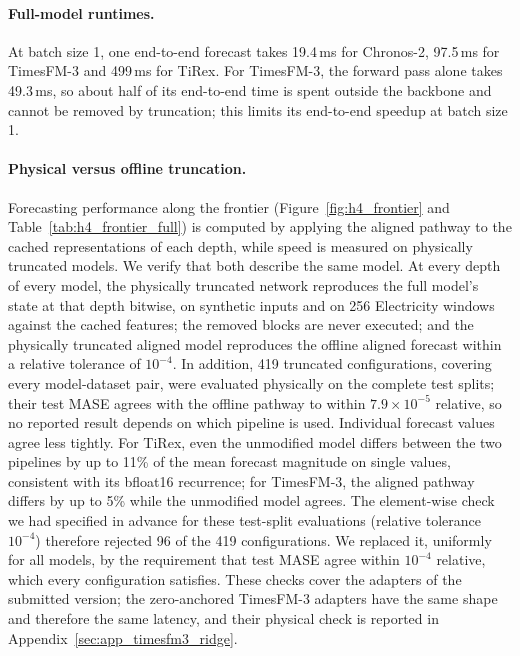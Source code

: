 \documentclass{article} %
\begin{document}
\paragraph{Full-model runtimes.} At batch size 1, one end-to-end forecast takes 19.4\,ms for
Chronos-2, 97.5\,ms for TimesFM-3 and 499\,ms for TiRex. For TimesFM-3, the forward pass alone takes
49.3\,ms, so about half of its end-to-end time is spent outside the backbone and cannot be removed
by truncation; this limits its end-to-end speedup at batch size 1.

\paragraph{Physical versus offline truncation.}
Forecasting performance along the frontier (Figure~\ref{fig:h4_frontier} and
Table~\ref{tab:h4_frontier_full}) is computed by applying the aligned pathway to the cached
representations of each depth, while speed is measured on physically truncated models. We verify
that both describe the same model. At every depth of every model, the physically truncated network
reproduces the full model's state at that depth bitwise, on synthetic inputs and on 256 Electricity
windows against the cached features; the removed blocks are never executed; and the physically
truncated aligned model reproduces the offline aligned forecast within a relative tolerance of
$10^{-4}$. In addition, 419 truncated configurations, covering every model-dataset pair, were
evaluated physically on the complete test splits; their test MASE agrees with the offline pathway
to within $7.9\times10^{-5}$ relative, so no reported result depends on which pipeline is used.
Individual forecast values agree less tightly. For TiRex, even the unmodified model differs between
the two pipelines by up to 11\% of the mean forecast magnitude on single values, consistent with its
bfloat16 recurrence; for TimesFM-3, the aligned pathway differs by up to 5\% while the unmodified
model agrees. The element-wise check we had specified in advance for these test-split evaluations
(relative tolerance $10^{-4}$) therefore rejected 96 of the 419 configurations. We replaced it,
uniformly for all models, by the requirement that test MASE agree within $10^{-4}$ relative, which
every configuration satisfies. These checks cover the adapters of the submitted version; the
zero-anchored TimesFM-3 adapters have the same shape and therefore the same latency, and their
physical check is reported in Appendix~\ref{sec:app_timesfm3_ridge}.
\end{document}
